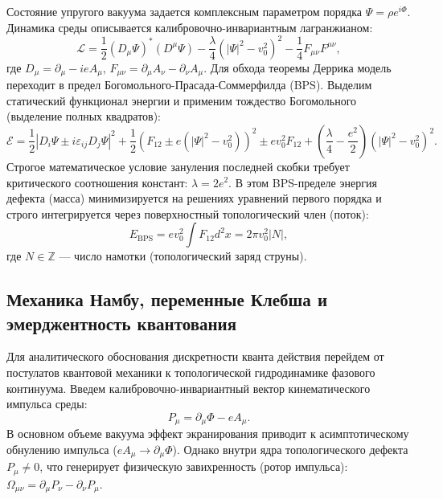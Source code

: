 \documentclass[11pt,a4paper]{article}
\begin{document}
Состояние упругого вакуума задается комплексным параметром порядка $\Psi = \rho e^{i\Phi}$. Динамика среды описывается калибровочно-инвариантным лагранжианом:
\begin{equation}
\mathcal{L} = \frac{1}{2} (D_\mu \Psi)^* (D^\mu \Psi) - \frac{\lambda}{4} (|\Psi|^2 - v_0^2)^2 - \frac{1}{4} F_{\mu\nu} F^{\mu\nu},
\label{eq:lagrangian}
\end{equation}
где $D_\mu = \partial_\mu - i e A_\mu$, $F_{\mu\nu} = \partial_\mu A_\nu - \partial_\nu A_\mu$. 
Для обхода теоремы Деррика модель переходит в предел Богомольного-Прасада-Соммерфилда (BPS). Выделим статический функционал энергии и применим тождество Богомольного (выделение полных квадратов):
\begin{equation}
\mathcal{E} = \frac{1}{2} |D_i \Psi \pm i \varepsilon_{ij} D_j \Psi|^2 + \frac{1}{2} \left(F_{12} \pm e(|\Psi|^2 - v_0^2)\right)^2 \pm e v_0^2 F_{12} + \left(\frac{\lambda}{4} - \frac{e^2}{2}\right) (|\Psi|^2 - v_0^2)^2.
\end{equation}
Строгое математическое условие зануления последней скобки требует критического соотношения констант: $\lambda = 2e^2$. В этом BPS-пределе энергия дефекта (масса) минимизируется на решениях уравнений первого порядка и строго интегрируется через поверхностный топологический член (поток):
\begin{equation}
E_{\text{BPS}} = e v_0^2 \int F_{12} d^2x = 2\pi v_0^2 |N|,
\end{equation}
где $N \in \mathbb{Z}$ — число намотки (топологический заряд струны).

\subsection{Механика Намбу, переменные Клебша и эмерджентность квантования}
Для аналитического обоснования дискретности кванта действия перейдем от постулатов квантовой механики к топологической гидродинамике фазового континуума. 
Введем калибровочно-инвариантный вектор кинематического импульса среды:
\begin{equation}
	P_\mu = \partial_\mu \Phi - e A_\mu.
\end{equation}
В основном объеме вакуума эффект экранирования приводит к асимптотическому обнулению импульса ($e A_\mu \to \partial_\mu \Phi$). Однако внутри ядра топологического дефекта $P_\mu \neq 0$, что генерирует физическую завихренность (ротор импульса): $\Omega_{\mu\nu} = \partial_\mu P_\nu - \partial_\nu P_\mu$.
\end{document}
